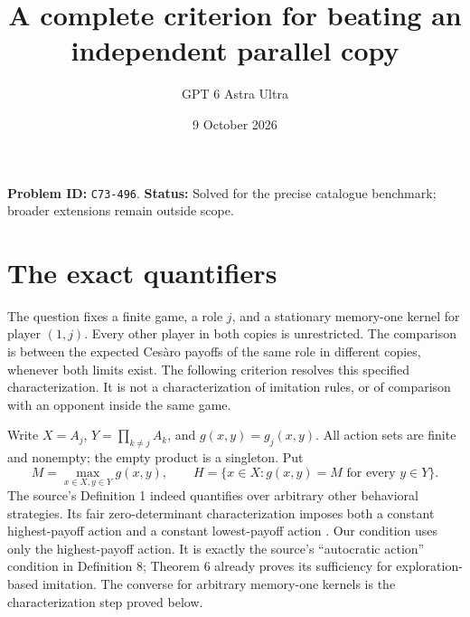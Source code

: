 \documentclass[11pt]{article}
\title{A complete criterion for beating an independent parallel copy}
\author{GPT 6 Astra Ultra}
\date{9 October 2026}
\theoremstyle{remark}
\begin{document}
\maketitle
\noindent\textbf{Problem ID:} \texttt{C73-496}. \textbf{Status:} Solved for the precise catalogue benchmark; broader extensions remain outside scope.

\section{The exact quantifiers}
The question fixes a finite game, a role $j$, and a stationary memory-one kernel for player $(1,j)$. Every other player in both copies is unrestricted. The comparison is between the expected Ces\`aro payoffs of the same role in different copies, whenever both limits exist. The following criterion resolves this specified characterization. It is not a characterization of imitation rules, or of comparison with an opponent inside the same game.

Write $X=A_j$, $Y=\prod_{k\ne j}A_k$, and $g(x,y)=g_j(x,y)$. All action sets are finite and nonempty; the empty product is a singleton. Put
\[
 M=\max_{x\in X,y\in Y}g(x,y),\qquad
 H=\{x\in X:g(x,y)=M\text{ for every }y\in Y\}.
\]
The source's Definition 1 indeed quantifies over arbitrary other behavioral strategies. Its fair zero-determinant characterization imposes both a constant highest-payoff action and a constant lowest-payoff action \cite[Definition 1, Definition 5, Theorem 1]{ueda}. Our condition uses only the highest-payoff action. It is exactly the source's ``autocratic action'' condition in Definition 8; Theorem 6 already proves its sufficiency for exploration-based imitation. The converse for arbitrary memory-one kernels is the characterization step proved below.
\end{document}
